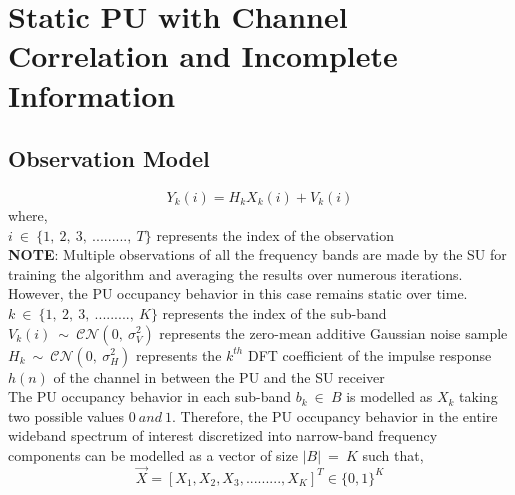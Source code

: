 \documentclass[12pt, draftcls, onecolumn]{IEEEtran}
\begin{document}
\section{Static PU with Channel Correlation and Incomplete Information}
\subsection{Observation Model}
\begin{equation}\label{28}
    Y_k(i) = H_kX_k(i) + V_k(i)
\end{equation}
where,
\\$i\ \in\ \{1,\ 2,\ 3,\ .........,\ T\}$ represents the index of the observation
\\\textbf{NOTE}: Multiple observations of all the frequency bands are made by the SU for training the algorithm and averaging the results over numerous iterations. However, the PU occupancy behavior in this case remains static over time.
\\$k\ \in\ \{1,\ 2,\ 3,\ .........,\ K\}$ represents the index of the sub-band
\\$V_k(i)\ \sim\ \mathcal{CN}(0,\ \sigma_V^2)$ represents the zero-mean additive Gaussian noise sample
\\$H_k\ \sim\ \mathcal{CN}(0,\ \sigma_H^2)$ represents the $k^{th}$ DFT coefficient of the impulse response $h(n)$ of the channel in between the PU and the SU receiver
\\The PU occupancy behavior in each sub-band $b_k\ \in\ B$ is modelled as $X_k$ taking two possible values $0\ and\ 1$. Therefore, the PU occupancy behavior in the entire wideband spectrum of interest discretized into narrow-band frequency components can be modelled as a vector of size $|B|\ =\ K$ such that,
\begin{equation}\label{29}
    \vec{X} = [X_1, X_2, X_3, ........., X_K]^T \in \{0,1\}^K
\end{equation}
\end{document}
